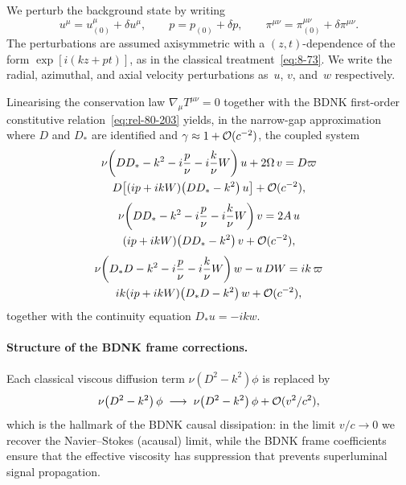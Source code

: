 We perturb the background state by writing
\begin{equation}
\label{eq:rel-80-208}
u^{\mu} = u^{\mu}_{(0)} + \delta u^{\mu},\qquad
p = p_{(0)} + \delta p,\qquad
\pi^{\mu\nu} = \pi^{\mu\nu}_{(0)} + \delta\pi^{\mu\nu}.
\end{equation}
The perturbations are assumed axisymmetric with a
$(z,t)$-dependence of the form $\exp[i(kz+pt)]$, as in the
classical treatment~\eqref{eq:8-73}.  We write the radial, azimuthal,
and axial velocity perturbations as~$u$, $v$, and~$w$ respectively.

Linearising the conservation law $\nabla_{\!\mu}T^{\mu\nu}=0$ together
with the BDNK first-order constitutive relation~\eqref{eq:rel-80-203}
yields, in the narrow-gap approximation where $D$ and $D_{*}$ are
identified and $\gamma\approx 1+\mathcal{O}(c^{-2})$, the coupled system
\begin{multline}
\label{eq:rel-80-209}
\nu\!\left(DD_{*}-k^{2}-i\frac{p}{\nu}-i\frac{k}{\nu}W\right)u
  + 2\Omega\,v
  = D\varpi \\
    D\!\left[\left(i p + i k W\right)
      \!\left(DD_{*}-k^{2}\right)u\right]
  + \mathcal{O}(c^{-2}),
\end{multline}
\begin{multline}
\label{eq:rel-80-210}
\nu\!\left(DD_{*}-k^{2}-i\frac{p}{\nu}-i\frac{k}{\nu}W\right)v
  = 2A\,u \\
    \left(ip+ikW\right)\!
    \left(DD_{*}-k^{2}\right)v
  + \mathcal{O}(c^{-2}),
\end{multline}
\begin{multline}
\label{eq:rel-80-211}
\nu\!\left(D_{*}D-k^{2}-i\frac{p}{\nu}-i\frac{k}{\nu}W\right)w
  - u\,DW
  = ik\,\varpi \\
    ik\!\left(ip+ikW\right)\!
    \left(D_{*}D-k^{2}\right)w
  + \mathcal{O}(c^{-2}),
\end{multline}
together with the continuity equation $D_{*}u=-ikw$.

\paragraph{Structure of the BDNK frame corrections.}
Each classical viscous diffusion term
$\nu(D^{2}-k^{2})\phi$ is replaced by
\begin{equation}
\label{eq:rel-80-212}
\nu\!\left(D^{2}-k^{2}\right)\phi
\;\longrightarrow\;
\nu\!\left(D^{2}-k^{2}\right)\phi
  + \mathcal{O}(v^{2}/c^{2}),
\end{equation}
which is the hallmark of the BDNK causal dissipation:
in the limit $v/c \to 0$ we recover the Navier--Stokes (acausal) limit, while
the BDNK frame coefficients ensure that the effective viscosity has
suppression that prevents superluminal signal propagation.

